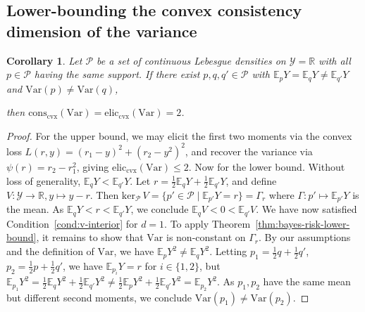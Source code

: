 \documentclass[11pt]{article} %
\newcommand{\Comments}{1}
\newcommand{\mytodo}[2]{\ifnum\Comments=1%
	\todo[linecolor=#1!80!black,backgroundcolor=#1,bordercolor=#1!80!black]{#2}\fi}
\newcommand{\jessiet}[1]{\mytodo{teal!20!white}{JF: #1}}
\newcommand{\btw}[1]{}%
\newcommand{\reals}{\mathbb{R}}
\newcommand{\eliccvx}{\mathrm{elic}_\mathrm{cvx}}
\newcommand{\conscvx}{\mathrm{cons}_\mathrm{cvx}}
\newcommand{\zeros}[1]{\mathrm{ker}_\P\,#1}
\newcommand{\E}{\mathbb{E}}
\renewcommand{\P}{\mathcal{P}}
\newcommand{\Y}{\mathcal{Y}}
\newcommand{\Var}{\mathrm{Var}}
\newtheorem{corollary}{Corollary}
\begin{document}



\subsection{Lower-bounding the convex consistency dimension of the variance}\label{app:variance}
\begin{corollary}
	\label{cor:variance}
	Let $\P$ be a set of continuous Lebesgue densities on $\Y=\reals$ with all $p \in \P$ having the same support.
	If there exist $p,q,q'\in\P$ with $\E_p Y = \E_q Y \neq \E_{q'} Y$ and $\Var(p) \neq \Var(q)$,
	\btw{Raf: I think this condition is tight actually: if there is no such triple in $\P$, I think $\eliccvx(\Var) \leq 1$ (i.e., $\Var$ is constant or a function of the mean)}
	then $\conscvx(\Var)=\eliccvx(\Var)=2$.
\end{corollary}
\begin{proof}
	For the upper bound, we may elicit the first two moments via the convex loss $L(r,y) = (r_1-y)^2 + (r_2-y^2)^2$, and recover the variance via $\psi(r) = r_2-r_1^2$, giving $\eliccvx(\Var) \leq 2$.
	Now for the lower bound.
	Without loss of generality, $\E_qY < \E_{q'}Y$.
	Let $r = \tfrac 1 2 \E_qY + \tfrac 1 2 \E_{q'}Y$, and define $V:\Y\to\reals, y\mapsto y-r$.
	Then $\zeros{V} = \{p'\in\P \mid \E_{p'}Y=r\} = \Gamma_r$ where $\Gamma:p'\mapsto \E_{p'}Y$ is the mean.
	As $\E_q Y < r < \E_{q'} Y$, we conclude $\E_q V < 0 < \E_{q'} V$.
	We have now satisfied Condition~\ref{cond:v-interior} for $d=1$.
	To apply Theorem~\ref{thm:bayes-risk-lower-bound}, it remains to show that $\Var$ is non-constant on $\Gamma_r$.
	By our assumptions and the definition of $\Var$, we have $\E_p Y^2 \neq \E_q Y^2$.
	Letting $p_1 = \tfrac 1 2 q + \tfrac 1 2 q'$, $p_2 = \tfrac 1 2 p + \tfrac 1 2 q'$, we have $\E_{p_i}Y = r$ for $i\in\{1,2\}$, but $\E_{p_1} Y^2 = \tfrac 1 2 \E_qY^2 + \tfrac 1 2 \E_{q'}Y^2 \neq \tfrac 1 2 \E_pY^2 + \tfrac 1 2 \E_{q'}Y^2 = \E_{p_2}Y^2$.
	As $p_1,p_2$ have the same mean but different second moments, we conclude $\Var(p_1) \neq \Var(p_2)$.
\end{proof}
\end{document}
